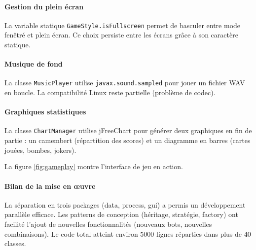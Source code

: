 \paragraph{Gestion du plein écran}
La variable statique \texttt{GameStyle.isFullscreen} permet de basculer entre mode fenêtré et plein écran. Ce choix persiste entre les écrans grâce à son caractère statique.

\paragraph{Musique de fond}
La classe \texttt{MusicPlayer} utilise \texttt{javax.sound.sampled} pour jouer un fichier WAV en boucle. La compatibilité Linux reste partielle (problème de codec).

\paragraph{Graphiques statistiques}
La classe \texttt{ChartManager} utilise jFreeChart pour générer deux graphiques en fin de partie : un camembert (répartition des scores) et un diagramme en barres (cartes jouées, bombes, jokers).

La figure \ref{fig:gameplay} montre l'interface de jeu en action.

\paragraph{Bilan de la mise en œuvre}
La séparation en trois packages (data, process, gui) a permis un développement parallèle efficace. Les patterns de conception (héritage, stratégie, factory) ont facilité l'ajout de nouvelles fonctionnalités (nouveaux bots, nouvelles combinaisons). Le code total atteint environ 5000 lignes réparties dans plus de 40 classes.
